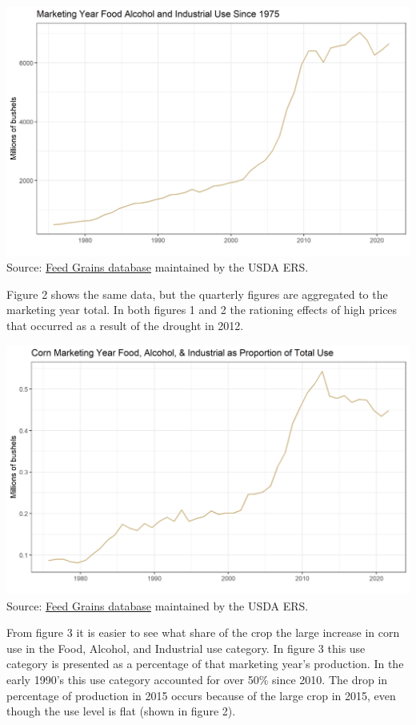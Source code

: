 \documentclass[
]{book}
\begin{document}
\includegraphics{assets/ForecastingUseof-CornUseCategoriesFoodAlcoholIndMY.png}
Source: \href{http://www.ers.usda.gov/data-products/feed-grains-database/feed-grains-yearbook-tables.aspx\#26780}{Feed Grains
database}
maintained by the USDA ERS.

Figure 2 shows the same data, but the quarterly figures are aggregated
to the marketing year total. In both figures 1 and 2 the rationing
effects of high prices that occurred as a result of the drought in 2012.

\includegraphics{assets/ForecastingUseof-CornUseCategoriesFoodAlcoholIndPropofUse.png}
Source: \href{http://www.ers.usda.gov/data-products/feed-grains-database/feed-grains-yearbook-tables.aspx\#26780}{Feed Grains
database}
maintained by the USDA ERS.

From figure 3 it is easier to see what share of the crop the large
increase in corn use in the Food, Alcohol, and Industrial use category.
In figure 3 this use category is presented as a percentage of that
marketing year's production. In the early 1990's this use category
accounted for over 50\% since 2010. The drop in percentage of production
in 2015 occurs because of the large crop in 2015, even though the use
level is flat (shown in figure 2).
\end{document}
